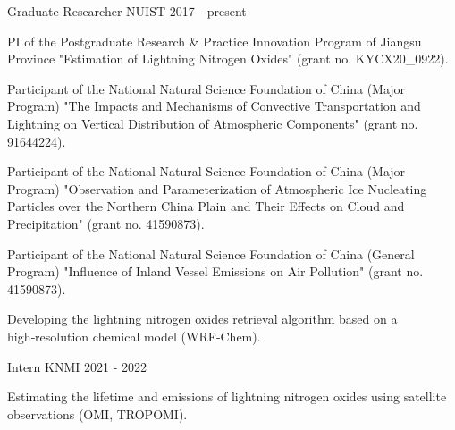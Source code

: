 


\begin{cventries}

  \cventry
    {Graduate Researcher} %
    {NUIST} %
    {2017 - present} %
    {}%
    {
      \begin{cvitems} %
        \item {PI of the Postgraduate Research \& Practice Innovation Program of Jiangsu Province "Estimation of Lightning Nitrogen Oxides" (grant no. KYCX20\_0922).}
        \item {Participant of the National Natural Science Foundation of China (Major Program) "The Impacts and Mechanisms of Convective Transportation and Lightning on Vertical Distribution of Atmospheric Components" (grant no. 91644224).}
        \item {Participant of the National Natural Science Foundation of China (Major Program) "Observation and Parameterization of Atmospheric Ice Nucleating Particles over the Northern China Plain and Their Effects on Cloud and Precipitation" (grant no. 41590873).}
        \item {Participant of the National Natural Science Foundation of China (General Program) "Influence of Inland Vessel Emissions on Air Pollution" (grant no. 41590873).}
        \item {Developing the lightning nitrogen oxides retrieval algorithm based on a high‑resolution chemical model (WRF‑Chem).}
      \end{cvitems}
    }

  \cventry
    {Intern} %
    {KNMI} %
    {2021 - 2022} %
    {}%
    {
      \begin{cvitems} %
        \item {Estimating the lifetime and emissions of lightning nitrogen oxides using satellite observations (OMI, TROPOMI).}
      \end{cvitems}
    }


\end{cventries}
